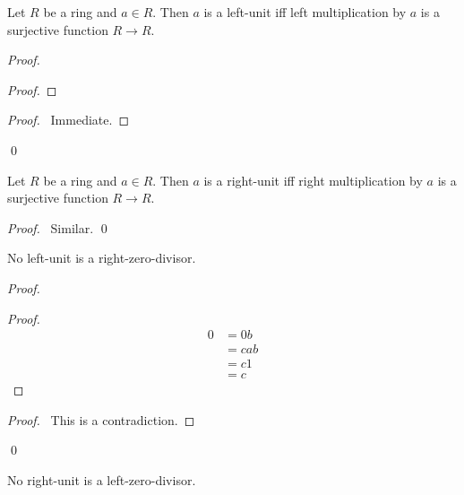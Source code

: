 \begin{prop}
Let $R$ be a ring and $a \in R$. Then $a$ is a left-unit iff left multiplication by $a$ is a surjective function $R \rightarrow R$.
\end{prop}

\begin{proof}
\pf
{}
\begin{proof}
\end{proof}
\begin{proof}
	\pf\ Immediate.
\end{proof}
\qed
\end{proof}

\begin{prop}
Let $R$ be a ring and $a \in R$. Then $a$ is a right-unit iff right multiplication by $a$ is a surjective function $R \rightarrow R$.
\end{prop}

\begin{proof}
\pf\ Similar. \qed
\end{proof}

\begin{prop}
\label{prop:no-left-unit-is-a-right-zero-divisor}
No left-unit is a right-zero-divisor.
\end{prop}

\begin{proof}
\pf
{}
\begin{proof}
	\pf
	\begin{align*}
		0 & = 0b \\
		& = cab \\
		& = c1 \\
		& = c
	\end{align*}
\end{proof}
\qedstep
\begin{proof}
	\pf\ This is a contradiction.
\end{proof}
\qed
\end{proof}

\begin{prop}
\label{prop:no-right-unit-is-a-left-zero-divisor}
No right-unit is a left-zero-divisor.
\end{prop}

